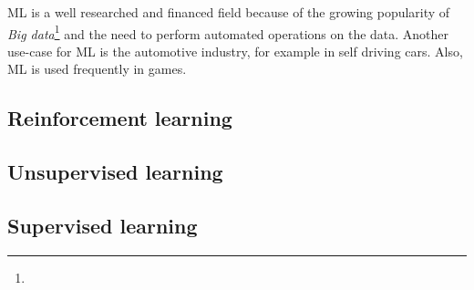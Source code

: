 ML is a well researched and financed field because of the growing popularity of \textit{Big data}\footnote{} and the need to perform automated operations on the data. Another use-case for ML is the automotive industry, for example in self driving cars. Also, ML is used frequently in games.

\subsection{Reinforcement learning} \label{reinforcementLearning}

\subsection{Unsupervised learning} \label{unsupervisedLearning}

\subsection{Supervised learning} \label{supervisedLearning}

